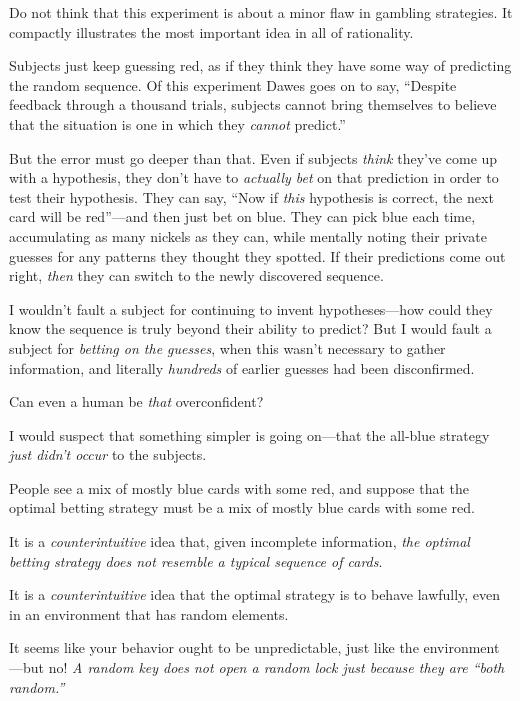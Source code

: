{
 Do not think that this experiment is about a minor flaw in
gambling strategies. It compactly illustrates the most important idea
in all of rationality.}

{
 Subjects just keep guessing red, as if they think they have some
way of predicting the random sequence. Of this experiment Dawes goes on
to say, ``Despite feedback through a thousand trials,
subjects cannot bring themselves to believe that the situation is one
in which they \textit{cannot} predict.''}

{
 But the error must go deeper than that. Even if subjects
\textit{think} they've come up with a hypothesis, they
don't have to \textit{actually bet} on that prediction
in order to test their hypothesis. They can say, ``Now
if \textit{this} hypothesis is correct, the next card will be
red''---and then just bet on blue. They can pick blue
each time, accumulating as many nickels as they can, while mentally
noting their private guesses for any patterns they thought they
spotted. If their predictions come out right, \textit{then} they can
switch to the newly discovered sequence.}

{
 I wouldn't fault a subject for continuing to
invent hypotheses---how could they know the sequence is truly beyond
their ability to predict? But I would fault a subject for
\textit{betting on the guesses}, when this wasn't
necessary to gather information, and literally \textit{hundreds} of
earlier guesses had been disconfirmed.}

{
 Can even a human be \textit{that} overconfident?}

{
 I would suspect that something simpler is going on---that the
all-blue strategy \textit{just didn't occur} to the
subjects.}

{
 People see a mix of mostly blue cards with some red, and suppose
that the optimal betting strategy must be a mix of mostly blue cards
with some red.}

{
 It is a \textit{counterintuitive} idea that, given incomplete
information, \textit{the optimal betting strategy does not resemble a
typical sequence of cards}.}

{
 It is a \textit{counterintuitive} idea that the optimal strategy
is to behave lawfully, even in an environment that has random
elements.}

{
 It seems like your behavior ought to be unpredictable, just like
the environment---but no! \textit{A random key does not open a random
lock just because they are ``both
random.''}}

